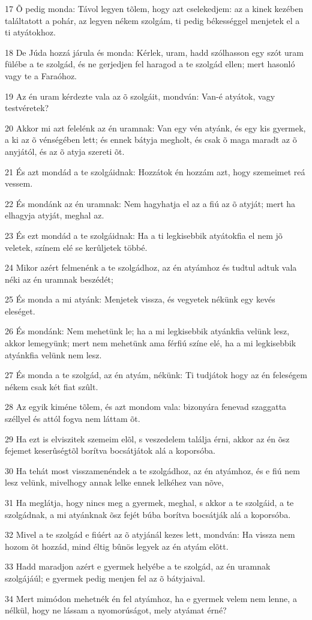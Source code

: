 \par 17 Õ pedig monda: Távol legyen tõlem, hogy azt cselekedjem: az a kinek kezében találtatott a pohár, az legyen nékem szolgám, ti pedig békességgel menjetek el a ti atyátokhoz.
\par 18 De Júda hozzá járula és monda: Kérlek, uram, hadd szólhasson egy szót uram fülébe a te szolgád, és ne gerjedjen fel haragod a te szolgád ellen; mert hasonló vagy te a Faraóhoz.
\par 19 Az én uram kérdezte vala az õ szolgáit, mondván: Van-é atyátok, vagy testvéretek?
\par 20 Akkor mi azt felelénk az én uramnak: Van egy vén atyánk, és egy kis gyermek, a ki az õ vénségében lett; és ennek bátyja megholt, és csak õ maga maradt az õ anyjától, és az õ atyja szereti õt.
\par 21 És azt mondád a te szolgáidnak: Hozzátok én hozzám azt, hogy szemeimet reá vessem.
\par 22 És mondánk az én uramnak: Nem hagyhatja el az a fiú az õ atyját; mert ha elhagyja atyját, meghal az.
\par 23 És ezt mondád a te szolgáidnak: Ha a ti legkisebbik atyátokfia el nem jõ veletek, színem elé se kerûljetek többé.
\par 24 Mikor azért felmenénk a te szolgádhoz, az én atyámhoz és tudtul adtuk vala néki az én uramnak beszédét;
\par 25 És monda a mi atyánk: Menjetek vissza, és vegyetek nékünk egy kevés eleséget.
\par 26 És mondánk: Nem mehetünk le; ha a mi legkisebbik atyánkfia velünk lesz, akkor lemegyünk; mert nem mehetünk ama férfiú színe elé, ha a mi legkisebbik atyánkfia velünk nem lesz.
\par 27 És monda a te szolgád, az én atyám, nékünk: Ti tudjátok hogy az én feleségem nékem csak két fiat szûlt.
\par 28 Az egyik kiméne tõlem, és azt mondom vala: bizonyára fenevad szaggatta széllyel és attól fogva nem láttam õt.
\par 29 Ha ezt is elviszitek szemeim elõl, s veszedelem találja érni, akkor az én õsz fejemet keserûségtõl borítva bocsátjátok alá a koporsóba.
\par 30 Ha tehát most visszamenéndek a te szolgádhoz, az én atyámhoz, és e fiú nem lesz velünk, mivelhogy annak lelke ennek lelkéhez van nõve,
\par 31 Ha meglátja, hogy nincs meg a gyermek, meghal, s akkor a te szolgáid, a te szolgádnak, a mi atyánknak õsz fejét búba borítva bocsátják alá a koporsóba.
\par 32 Mivel a te szolgád e fiúért az õ atyjánál kezes lett, mondván: Ha vissza nem hozom õt hozzád, mind éltig bûnös legyek az én atyám elõtt.
\par 33 Hadd maradjon azért e gyermek helyébe a te szolgád, az én uramnak szolgájáúl; e gyermek pedig menjen fel az õ bátyjaival.
\par 34 Mert mimódon mehetnék én fel atyámhoz, ha e gyermek velem nem lenne, a nélkül, hogy ne lássam a nyomorúságot, mely atyámat érné?

